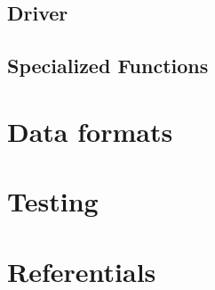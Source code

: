 \documentclass[11pt,a4paper]{report}
\begin{document}
\section{Driver} 

\section{Specialized Functions} 

\chapter{Data formats}\thispagestyle{fancy}

\chapter{Testing}\thispagestyle{fancy} 

\chapter{Referentials}\thispagestyle{fancy} 
\end{document}
